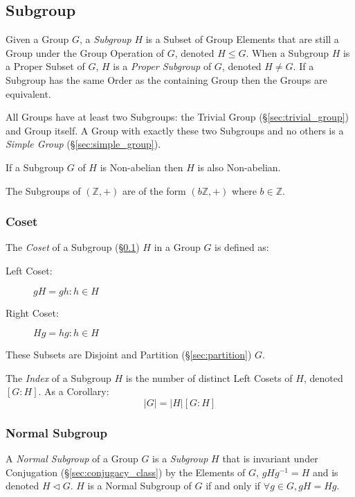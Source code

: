 \subsection{Subgroup}\label{sec:subgroup}

Given a Group $G$, a \emph{Subgroup} $H$ is a Subset of Group Elements
that are still a Group under the Group Operation of $G$, denoted $H
\leq G$. When a Subgroup $H$ is a Proper Subset of $G$, $H$ is a
\emph{Proper Subgroup} of $G$, denoted $H \neq G$. If a Subgroup has
the same Order as the containing Group then the Groups are equivalent.

All Groups have at least two Subgroups: the Trivial Group
(\S\ref{sec:trivial_group}) and Group itself. A Group with exactly
these two Subgroups and no others is a \emph{Simple Group}
(\S\ref{sec:simple_group}).

If a Subgroup $G$ of $H$ is Non-abelian then $H$ is also Non-abelian.

The Subgroups of $(\mathbb{Z},+)$ are of the form $(b\mathbb{Z},+)$
where $b \in \mathbb{Z}$.



\subsubsection{Coset}\label{sec:coset}

The \emph{Coset} of a Subgroup (\S\ref{sec:subgroup}) $H$ in a Group
$G$ is defined as:
\begin{description}
\item[Left Coset:] $gH = {gh : h \in H}$
\item[Right Coset:] $Hg = {hg : h \in H}$
\end{description}
These Subsets are Disjoint and Partition (\S\ref{sec:partition}) $G$.

The \emph{Index} of a Subgroup $H$ is the number of distinct Left
Cosets of $H$, denoted $[G:H]$. As a Corollary:
\[
    |G| = |H|[G:H]
\]



\subsubsection{Normal Subgroup}\label{sec:normal_subgroup}

A \emph{Normal Subgroup} of a Group $G$ is a \emph{Subgroup} $H$ that is
invariant under Conjugation (\S\ref{sec:conjugacy_class}) by the Elements of
$G$, $gHg^{-1} = H$ and is denoted $H \triangleleft G$. $H$ is a Normal Subgroup
of $G$ if and only if $\forall g \in G, gH = Hg$.

